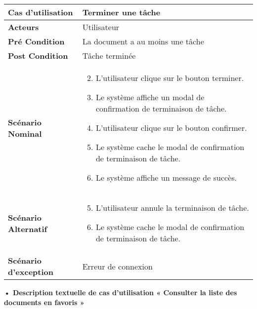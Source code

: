 \begin{longtable}{|p{5cm}|p{10cm}|}
\hline
\textbf{Cas d'utilisation}&Terminer une tâche\\
\hline
\textbf{Acteurs}&Utilisateur\\
\hline
\textbf{Pré Condition}&La document a au moins une tâche\\
\hline
\textbf{Post Condition}&Tâche terminée\\
\hline
\textbf{Scénario Nominal}&
\vspace{-\baselineskip}
\begin{enumerate}
    \setcounter{enumi}{1}
    \item L'utilisateur clique sur le bouton terminer.
    \item Le système affiche un modal de confirmation de terminaison de tâche.
    \item L'utilisateur clique sur le bouton confirmer.
    \item Le système cache le modal de confirmation de terminaison de tâche.
    \item Le système affiche un message de succès.
\end{enumerate}\\
\hline
\textbf{Scénario Alternatif}&
\vspace{-\baselineskip}
\begin{enumerate}
    \setcounter{enumi}{4}
    \item L'utilisateur annule la terminaison de tâche.
    \item Le système cache le modal de confirmation de terminaison de tâche.
\end{enumerate}\\
\hline
\textbf{Scénario d'exception}&Erreur de connexion\\
\hline
\end{longtable}



\textbf{•	Description textuelle de cas d'utilisation « Consulter la liste des documents en favoris  »}

